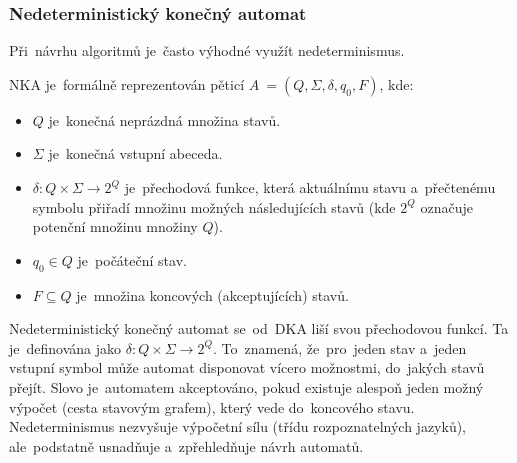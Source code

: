 \documentclass[
  master,
  program=ainfvs,
  printversion,
  figures=false,
  tables=false,
  glossaries,
  index
]{kidiplom}
\begin{document}
\subsubsection{Nedeterministický konečný automat}
Při~návrhu algoritmů je~často výhodné využít nedeterminismus. \begin{definition}
\gls{NKA} je~formálně reprezentován pěticí $A~= (Q, \Sigma, \delta, q_0, F)$, kde:
\begin{itemize}
    \item $Q$ je~konečná neprázdná množina stavů.
    \item $\Sigma$ je~konečná vstupní abeceda.
    \item $\delta: Q \times \Sigma \rightarrow 2^Q$ je~přechodová funkce, která aktuálnímu stavu a~přečtenému symbolu přiřadí množinu možných následujících stavů (kde $2^Q$ označuje potenční množinu množiny $Q$).
    \item $q_0 \in Q$ je~počáteční stav.
    \item $F \subseteq Q$ je~množina koncových (akceptujících) stavů.
\end{itemize}
\end{definition} Nedeterministický konečný automat se~od~DKA liší svou přechodovou funkcí. Ta je~definována jako $\delta: Q \times \Sigma \rightarrow 2^Q$. To~znamená, že~pro~jeden stav a~jeden vstupní symbol může automat disponovat vícero možnostmi, do~jakých stavů přejít. Slovo je~automatem akceptováno, pokud existuje alespoň jeden možný výpočet (cesta stavovým grafem), který vede do~koncového stavu. Nedeterminismus nezvyšuje výpočetní sílu (třídu rozpoznatelných jazyků), ale~podstatně usnadňuje a~zpřehledňuje návrh automatů.
\end{document}
